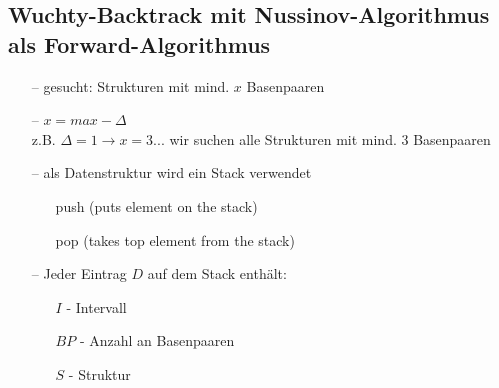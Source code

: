 \subsection{Wuchty-Backtrack mit Nussinov-Algorithmus als Forward-Algorithmus}
\begin{itemize}
\item[--]gesucht: Strukturen mit mind. $x$ Basenpaaren
\item[--]$x=max-\Delta$ \\ z.B. $\Delta=1 \rightarrow x=3...$ wir suchen alle Strukturen mit mind. 3 Basenpaaren
\item[--]als Datenstruktur wird ein Stack verwendet
	\begin{itemize}
	\item[]push (puts element on the stack)
	\item[]pop (takes top element from the stack)
	\end{itemize}
\item[--]Jeder Eintrag $D$ auf dem Stack enth\"alt:
	\begin{itemize}
	\item[]$I$ - Intervall
	\item[]$BP$ - Anzahl an Basenpaaren
	\item[]$S$ - Struktur
	\end{itemize}
\end{itemize}
